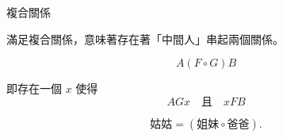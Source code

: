 \documentclass{Slideshow}
\begin{document}
\begin{frame}{複合關係}
    \begin{definition}
        滿足複合關係，意味著存在著「中間人」串起兩個關係。

        \[ A \left( F \circ G \right) B \]

        即存在一個 $x$ 使得
        \[ AGx \quad \mbox{且} \quad xFB \]
    \end{definition}

    \begin{example}
        \[ \mbox{姑姑} = \left( \mbox{姐妹} \circ \mbox{爸爸} \right). \]
    \end{example}
\end{frame}
\end{document}
